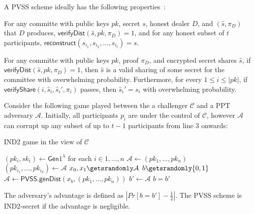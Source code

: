 A PVSS scheme ideally has the following properties~\cite{pvss_pairings_heidervand}:
\begin{definition}[Correctness]
    For any committe with public keys $pk$, secret $s$, honest dealer $D$, and $(\hat{s}, \pi_D)$ that $D$ produces, $\textsf{verifyDist}(\hat{s}, pk, \pi_D) = 1$, and for any honest subset of $t$ participants, $\textsf{reconstruct}(s_{i_1}, s_{i_2}, \dots, s_{i_t}) = s$.
\end{definition}
\begin{definition}[Verifiability]
    For any committe with public keys $pk$, proof $\pi_D$, and encrypted secret shares $\hat{s}$, if $\textsf{verifyDist}(\hat{s}, pk, \pi_D) = 1$, then $\hat{s}$ is a valid sharing of some secret for the committee with overwhelming probability.
    Furthermore, for every $1 \leq i \leq |pk|$, if $\textsf{verifyShare}(i, \hat{s}_i, \hat{s}_i', \pi_i)$ passes, then $\hat{s}_i' = s_i$ with overwhelming probability.
\end{definition}
\begin{definition}
    Consider the following game played between the a challenger $\mathcal{C}$ and a PPT adversary $\mathcal{A}$.
    Initially, all participants $p_i$ are under the control of $\mathcal{C}$, however $\mathcal{A}$ can corrupt up any subset of up to $t-1$ participants from line 3 onwards:
    \begin{algorithm}[h]
    \caption{IND2 game in the view of $\mathcal{C}$}
        \begin{algorithmic}[1]
            \State $(pk_i, sk_i) \gets \textsf{Gen}{1^{\lambda}}$ for each $i \in 1, \dots, n$
            \State $\mathcal{A} \gets (pk_1, \dots, pk_n)$
            \State $(pk_{i_1}, \dots, pk_{i_k}) \gets \mathcal{A}$
            \State $x_0, x_1 \getsrandomly \mathcal{A}$
            \State $b \getsrandomly \{0, 1\}$
            \State $\mathcal{A} \gets \textsf{PVSS.genDist}(x_b, (pk_1, \dots, pk_n))$
            \State $b' \gets \mathcal{A}$
            \State \Return $b = b'$
        \end{algorithmic}
    \end{algorithm}
    The adversary's advantage is defined as $|Pr[b = b'] - \frac{1}{2}|$.
    The PVSS scheme is IND2-secret if the advantage is negligible.
\end{definition}

